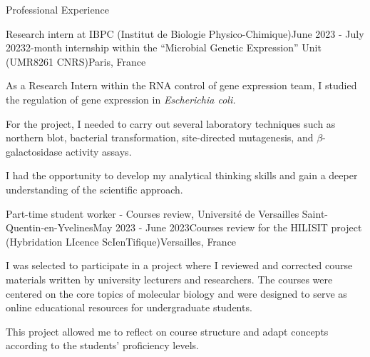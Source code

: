 \documentclass[
	10pt,
]{style} %
\begin{document}

\begin{rSection}{Professional Experience}

	\begin{rSubsection}{Research intern at IBPC (Institut de Biologie Physico-Chimique)}{June 2023 - July 2023}{2-month internship within the ``Microbial Genetic Expression'' Unit (UMR8261 CNRS)}{Paris, France}
		\item As a Research Intern within the RNA control of gene expression team, I studied the regulation of gene expression in \textit{Escherichia coli.}
		\item For the project, I needed to carry out several laboratory techniques such as northern blot, bacterial transformation, site-directed mutagenesis, and $\beta$-galactosidase activity assays.
		\item I had the opportunity to develop my analytical thinking skills and gain a deeper understanding of the scientific approach.
	\end{rSubsection}


	\begin{rSubsection}{Part-time student worker - Courses review, Université de Versailles Saint-Quentin-en-Yvelines}{May 2023 - June 2023}{Courses review for the HILISIT project (Hybridation LIcence ScIenTifique)}{Versailles, France}
		\item I was selected to participate in a project where I reviewed and corrected course materials written by university lecturers and researchers. The courses were centered on the core topics of molecular biology and were designed to serve as online educational resources for undergraduate students.
		\item This project allowed me to reflect on course structure and adapt concepts according to the students' proficiency levels.
	\end{rSubsection}

\end{rSection}

\end{document}
